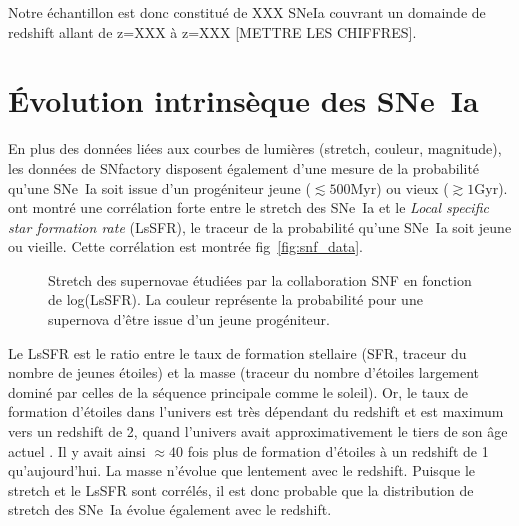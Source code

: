 \documentclass[a4paper, 12pt, svgnames]{article}
\newcommand{\mr}[1]{{\textcolor[rgb]{0.80,0.10,0.1}{#1}}}
\begin{document}
\mr{Notre échantillon est donc constitué de XXX SNeIa couvrant un domainde de redshift allant de z=XXX à z=XXX [METTRE LES CHIFFRES].}

\section{Évolution intrinsèque des SNe~Ia}\label{sec:stretchevol}

En plus des données liées aux courbes de lumières (stretch, couleur, magnitude),
les données de SNfactory disposent également d'une mesure de la probabilité
qu'une SNe~Ia soit issue d'un progéniteur jeune ($\lesssim 500 \mathrm{Myr}$) ou
vieux ($\gtrsim 1 \mathrm{Gyr}$). \cite{rigault_strong_2018} ont montré une
corrélation forte entre le stretch des SNe~Ia et le \textit{Local specific star
formation rate} (LsSFR), le traceur de la probabilité qu'une SNe~Ia soit jeune
ou vieille. Cette corrélation est montrée fig~\ref{fig:snf_data}.

\begin{figure}[htbp!]
    \centering
    \captionsetup{justification=centering}
    \caption{Stretch des supernovae étudiées par la collaboration SNF en
    fonction de log(LsSFR). La couleur représente la probabilité pour une
supernova d'être issue d'un jeune progéniteur.}
\end{figure}

Le LsSFR est le ratio entre le taux de formation stellaire (SFR, traceur du
nombre de jeunes étoiles) et la masse (traceur du nombre d'étoiles largement
dominé par celles de la séquence principale comme le soleil). Or, le taux de
formation d'étoiles dans l'univers est très dépendant du redshift et est maximum
vers un redshift de 2, quand l'univers avait approximativement le tiers de son
âge actuel \cite{madau_cosmic_2014}. Il y avait ainsi $\approx40$ fois plus de
formation d'étoiles à un redshift de 1 qu'aujourd'hui. La masse n'évolue que
lentement avec le redshift. Puisque le stretch et le LsSFR sont corrélés, il est
donc probable que la distribution de stretch des SNe~Ia évolue également avec le
redshift.
\end{document}
